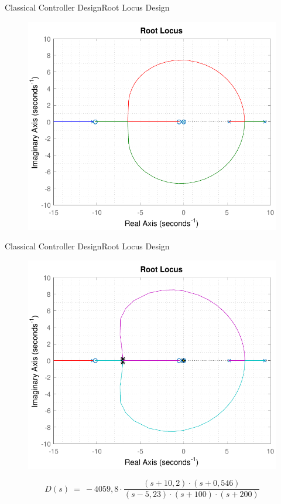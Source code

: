 \begin{frame}{Classical Controller Design}{Root Locus Design}	
	\begin{figure}
		\includegraphics[scale=.55]{Pictures/RLController2}
		\centering
	\end{figure}
\end{frame}

\begin{frame}{Classical Controller Design}{Root Locus Design}
\begin{figure}
	\includegraphics[scale=.55]{Pictures/RLController}
	\centering
\end{figure}	
%
\pause
%
\begin{displaymath}
	\si{D(s)\ =\ -4059,8 \cdot \frac{(s + 10,2)\cdot (s + 0,546)}{(s - 5,23) \cdot (s + 100) \cdot (s + 200)}} \nonumber
\end{displaymath}
\end{frame}

